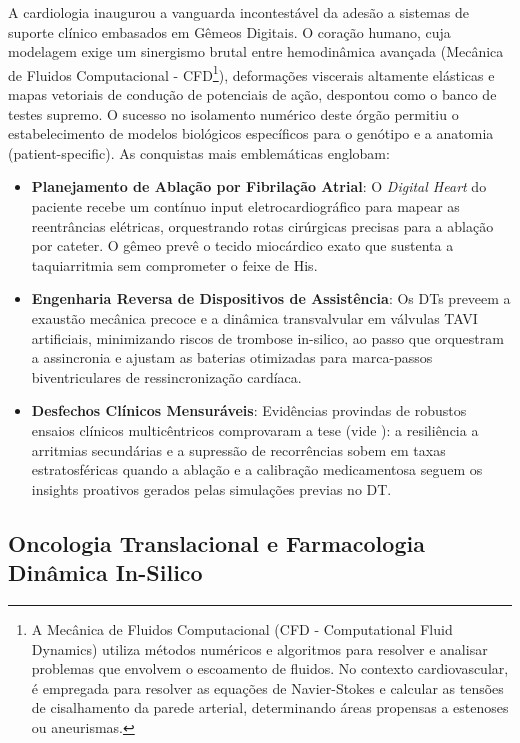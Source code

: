 A cardiologia inaugurou a vanguarda incontestável da adesão a sistemas de suporte clínico embasados em Gêmeos Digitais. O coração humano, cuja modelagem exige um sinergismo brutal entre hemodinâmica avançada (Mecânica de Fluidos Computacional - CFD\footnote{A Mecânica de Fluidos Computacional (CFD - Computational Fluid Dynamics) utiliza métodos numéricos e algoritmos para resolver e analisar problemas que envolvem o escoamento de fluidos. No contexto cardiovascular, é empregada para resolver as equações de Navier-Stokes e calcular as tensões de cisalhamento da parede arterial, determinando áreas propensas a estenoses ou aneurismas.}), deformações viscerais altamente elásticas e mapas vetoriais de condução de potenciais de ação, despontou como o banco de testes supremo. O sucesso no isolamento numérico deste órgão permitiu o estabelecimento de modelos biológicos específicos para o genótipo e a anatomia (patient-specific). As conquistas mais emblemáticas englobam:

\begin{itemize}
    \item \textbf{Planejamento de Ablação por Fibrilação Atrial}: O \textit{Digital Heart} do paciente recebe um contínuo input eletrocardiográfico para mapear as reentrâncias elétricas, orquestrando rotas cirúrgicas precisas para a ablação por cateter. O gêmeo prevê o tecido miocárdico exato que sustenta a taquiarritmia sem comprometer o feixe de His.
    \item \textbf{Engenharia Reversa de Dispositivos de Assistência}: Os DTs preveem a exaustão mecânica precoce e a dinâmica transvalvular em válvulas TAVI artificiais, minimizando riscos de trombose in-silico, ao passo que orquestram a assincronia e ajustam as baterias otimizadas para marca-passos biventriculares de ressincronização cardíaca.
    \item \textbf{Desfechos Clínicos Mensuráveis}: Evidências provindas de robustos ensaios clínicos multicêntricos comprovaram a tese (vide \cite{katsoulakis2024digital}): a resiliência a arritmias secundárias e a supressão de recorrências sobem em taxas estratosféricas quando a ablação e a calibração medicamentosa seguem os insights proativos gerados pelas simulações previas no DT.
\end{itemize}

\subsection{Oncologia Translacional e Farmacologia Dinâmica In-Silico}

